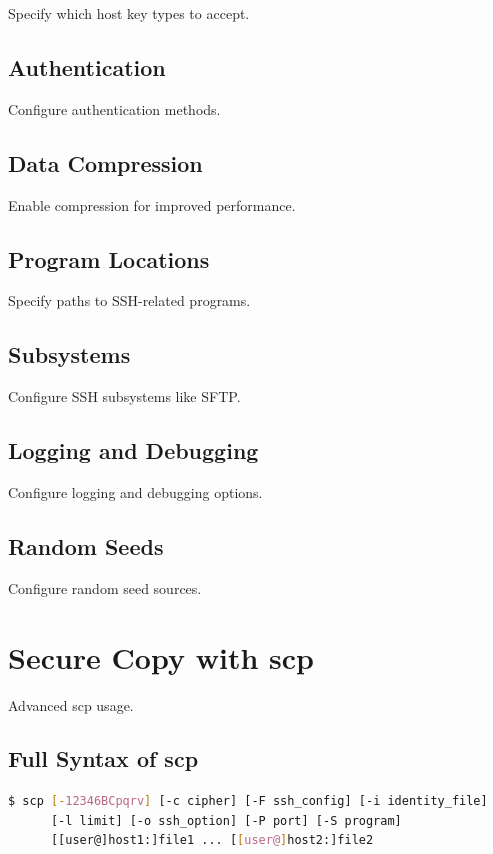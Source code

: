 \documentclass[12pt]{book}
\begin{document}
Specify which host key types to accept.

\subsection{Authentication}

Configure authentication methods.

\subsection{Data Compression}

Enable compression for improved performance.

\subsection{Program Locations}

Specify paths to SSH-related programs.

\subsection{Subsystems}

Configure SSH subsystems like SFTP.

\subsection{Logging and Debugging}

Configure logging and debugging options.

\subsection{Random Seeds}

Configure random seed sources.

\section{Secure Copy with scp}

Advanced scp usage.

\subsection{Full Syntax of scp}

\begin{lstlisting}[language=bash]
$ scp [-12346BCpqrv] [-c cipher] [-F ssh_config] [-i identity_file]
      [-l limit] [-o ssh_option] [-P port] [-S program]
      [[user@]host1:]file1 ... [[user@]host2:]file2
\end{lstlisting}
\end{document}
